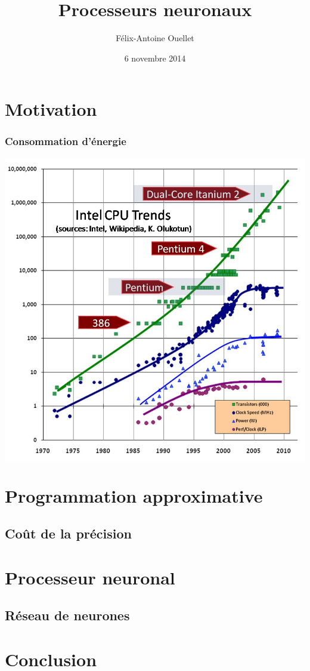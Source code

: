 \documentclass{beamer}
\author[Félix-Antoine Ouellet]{Félix-Antoine Ouellet}
\title[NPU\hspace{2em}\insertframenumber/\inserttotalframenumber]{Processeurs neuronaux}
\institute{Université de Sherbrooke}
\date{6 novembre 2014}
\begin{document}
\begin{frame}
\titlepage %
\end{frame}

\begin{frame}
\tableofcontents[hideallsubsections]
\end{frame}

\section{Motivation}
\begin{frame}
\frametitle{Consommation d'énergie}
\begin{center}
\colorbox{white}{\includegraphics[scale=0.43]{CPU-Scaling.jpg}}
\end{center}
\end{frame}

\section{Programmation approximative}
\subsection{Coût de la précision}
\begin{frame}
\end{frame}

\section{Processeur neuronal}
\subsection{Réseau de neurones}
\begin{frame}
\end{frame}

\section{Conclusion}
\begin{frame}
\end{frame}
\end{document}
